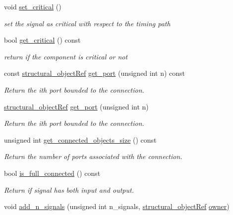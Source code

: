 \begin{DoxyCompactItemize}
\item 
void \hyperlink{classsignal__o_a3fcdae87bd77e9146c2643fd717079ac}{set\+\_\+critical} ()
\begin{DoxyCompactList}\small\item\em set the signal as critical with respect to the timing path \end{DoxyCompactList}\item 
bool \hyperlink{classsignal__o_a2b78992ddcbbcdb36f30e44ac9c502aa}{get\+\_\+critical} () const
\begin{DoxyCompactList}\small\item\em return if the component is critical or not \end{DoxyCompactList}\item 
const \hyperlink{structural__objects_8hpp_a8ea5f8cc50ab8f4c31e2751074ff60b2}{structural\+\_\+object\+Ref} \hyperlink{classsignal__o_a34f5a745bbc0a08d7178396abe2637dd}{get\+\_\+port} (unsigned int n) const
\begin{DoxyCompactList}\small\item\em Return the ith port bounded to the connection. \end{DoxyCompactList}\item 
\hyperlink{structural__objects_8hpp_a8ea5f8cc50ab8f4c31e2751074ff60b2}{structural\+\_\+object\+Ref} \hyperlink{classsignal__o_a3ba0a7224953c8e3cdbd9787f50bd5c0}{get\+\_\+port} (unsigned int n)
\begin{DoxyCompactList}\small\item\em Return the ith port bounded to the connection. \end{DoxyCompactList}\item 
unsigned int \hyperlink{classsignal__o_a7c10e814a8df1b8cbb19043fc8da4a0f}{get\+\_\+connected\+\_\+objects\+\_\+size} () const
\begin{DoxyCompactList}\small\item\em Return the number of ports associated with the connection. \end{DoxyCompactList}\item 
bool \hyperlink{classsignal__o_af383bc62f79975c162fe66fe35a38b22}{is\+\_\+full\+\_\+connected} () const
\begin{DoxyCompactList}\small\item\em Return if signal has both input and output. \end{DoxyCompactList}\item 
void \hyperlink{classsignal__o_ad5d3e5aa20af5d00401badcf9dcabbeb}{add\+\_\+n\+\_\+signals} (unsigned int n\+\_\+signals, \hyperlink{structural__objects_8hpp_a8ea5f8cc50ab8f4c31e2751074ff60b2}{structural\+\_\+object\+Ref} \hyperlink{classstructural__object_a3e96b3e00b8a78adfc44872d82e186ea}{owner})

\end{DoxyCompactItemize}
